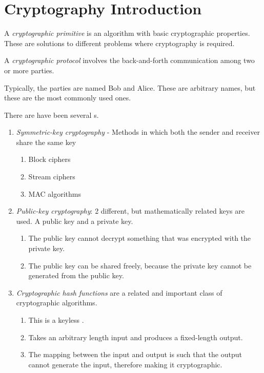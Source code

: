 \section{Cryptography Introduction}\label{sec:Intro_Cryptography}
\begin{definition}\label{def:Cryptographic_Primitive}
  A \emph{cryptographic primitive} is an algorithm with basic cryptographic properties.
  These are solutions to different problems where cryptography is required.
\end{definition}

\begin{definition}\label{def:Cryptographic_Protocol}
  A \emph{cryptographic protocol} involves the back-and-forth communication among two or more parties.

  \begin{remark}\label{rmk:Bob_and_Alice}
    Typically, the parties are named Bob and Alice.
    These are arbitrary names, but these are the most commonly used ones.
  \end{remark}
\end{definition}

There are have been several s.
\begin{enumerate}[noitemsep]
\item \textit{Symmetric-key cryptography} - Methods in which both the sender and receiver share the same key
  \begin{enumerate}[noitemsep]
  \item Block ciphers
  \item Stream ciphers
  \item MAC algorithms
  \end{enumerate}
\item \textit{Public-key cryptography}: 2 different, but mathematically related keys are used.
  A public key and a private key.
  \begin{enumerate}[noitemsep]
  \item The public key cannot decrypt something that was encrypted with the private key.
  \item The public key can be shared freely, because the private key cannot be generated from the public key.
  \end{enumerate}
\item \textit{Cryptographic hash functions} are a related and important class of cryptographic algorithms.
  \begin{enumerate}[noitemsep]
  \item This is a keyless .
  \item Takes an arbitrary length input and produces a fixed-length output.
  \item The mapping between the input and output is such that the output cannot generate the input, therefore making it cryptographic.
  \end{enumerate}
\end{enumerate}

